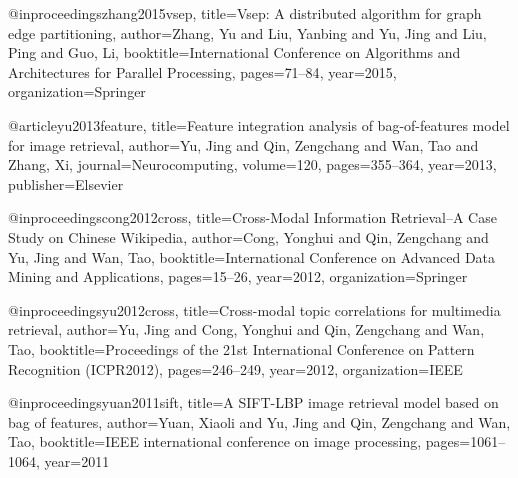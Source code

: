 @inproceedings{zhang2015vsep,
  title={Vsep: A distributed algorithm for graph edge partitioning},
  author={Zhang, Yu and Liu, Yanbing and Yu, Jing and Liu, Ping and Guo, Li},
  booktitle={International Conference on Algorithms and Architectures for Parallel Processing},
  pages={71--84},
  year={2015},
  organization={Springer}
}

@article{yu2013feature,
  title={Feature integration analysis of bag-of-features model for image retrieval},
  author={Yu, Jing and Qin, Zengchang and Wan, Tao and Zhang, Xi},
  journal={Neurocomputing},
  volume={120},
  pages={355--364},
  year={2013},
  publisher={Elsevier}
}

@inproceedings{cong2012cross,
  title={Cross-Modal Information Retrieval--A Case Study on Chinese Wikipedia},
  author={Cong, Yonghui and Qin, Zengchang and Yu, Jing and Wan, Tao},
  booktitle={International Conference on Advanced Data Mining and Applications},
  pages={15--26},
  year={2012},
  organization={Springer}
}

@inproceedings{yu2012cross,
  title={Cross-modal topic correlations for multimedia retrieval},
  author={Yu, Jing and Cong, Yonghui and Qin, Zengchang and Wan, Tao},
  booktitle={Proceedings of the 21st International Conference on Pattern Recognition (ICPR2012)},
  pages={246--249},
  year={2012},
  organization={IEEE}
}

@inproceedings{yuan2011sift,
  title={A SIFT-LBP image retrieval model based on bag of features},
  author={Yuan, Xiaoli and Yu, Jing and Qin, Zengchang and Wan, Tao},
  booktitle={IEEE international conference on image processing},
  pages={1061--1064},
  year={2011}
}



